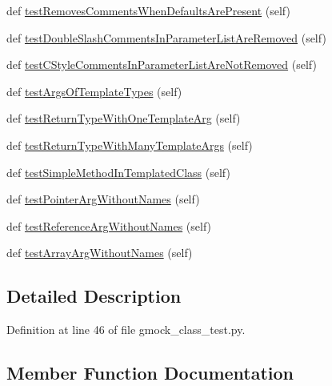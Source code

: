 \begin{DoxyCompactItemize}
\item 
def \hyperlink{classcpp_1_1gmock__class__test_1_1GenerateMethodsTest_add445941c6503198f0c3a25e00d20b9f}{test\+Removes\+Comments\+When\+Defaults\+Are\+Present} (self)
\item 
def \hyperlink{classcpp_1_1gmock__class__test_1_1GenerateMethodsTest_abb9fce46de4ac1d2943b85e84ce14c83}{test\+Double\+Slash\+Comments\+In\+Parameter\+List\+Are\+Removed} (self)
\item 
def \hyperlink{classcpp_1_1gmock__class__test_1_1GenerateMethodsTest_afa44c6ac675ce7454ff0f51164bde59e}{test\+C\+Style\+Comments\+In\+Parameter\+List\+Are\+Not\+Removed} (self)
\item 
def \hyperlink{classcpp_1_1gmock__class__test_1_1GenerateMethodsTest_ade05313ccffe74f9eaa42fb66c14f702}{test\+Args\+Of\+Template\+Types} (self)
\item 
def \hyperlink{classcpp_1_1gmock__class__test_1_1GenerateMethodsTest_a747b7b1b9da071eb8e1e2b84c7ee3614}{test\+Return\+Type\+With\+One\+Template\+Arg} (self)
\item 
def \hyperlink{classcpp_1_1gmock__class__test_1_1GenerateMethodsTest_affdc748928d26be259345ed6a8753988}{test\+Return\+Type\+With\+Many\+Template\+Args} (self)
\item 
def \hyperlink{classcpp_1_1gmock__class__test_1_1GenerateMethodsTest_a964a1b55f2096edf7a6165734b1f0619}{test\+Simple\+Method\+In\+Templated\+Class} (self)
\item 
def \hyperlink{classcpp_1_1gmock__class__test_1_1GenerateMethodsTest_a6a2118fde4c59d2f8f402652e7aa8896}{test\+Pointer\+Arg\+Without\+Names} (self)
\item 
def \hyperlink{classcpp_1_1gmock__class__test_1_1GenerateMethodsTest_af82b50cc3f5daee5f6650fff1323e30c}{test\+Reference\+Arg\+Without\+Names} (self)
\item 
def \hyperlink{classcpp_1_1gmock__class__test_1_1GenerateMethodsTest_a544cd40e30b5dc3fbcf42385f0a54ad1}{test\+Array\+Arg\+Without\+Names} (self)
\end{DoxyCompactItemize}


\subsection{Detailed Description}


Definition at line 46 of file gmock\+\_\+class\+\_\+test.\+py.



\subsection{Member Function Documentation}
\mbox{\label{classcpp_1_1gmock__class__test_1_1GenerateMethodsTest_af96a6c9fd394f7e27cf24f86814549c9}} 
